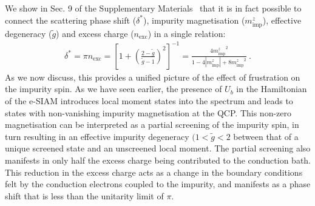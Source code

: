 \documentclass{iopart}
\begin{document}
We show in Sec. 9 of the Supplementary Materials~\cite{supp_mat} that it is in fact  possible to connect the scattering phase shift ($\delta^{*}$), impurity magnetisation ($m_{\text{imp}}^{z}$), effective degeneracy ($\tilde{g}$) and excess charge ($n_{\text{exc}}$) in a single relation:
\begin{eqnarray}\label{phase-mag}
	\delta^* = \pi n_\text{exc} = \left[1 + \left(\frac{2-\tilde g}{\tilde g-1}\right)^2\right]^{-1} = \frac{4{m_{\text{imp}}^z}^2}{1 - 4|m_{\text{imp}}^z| + 8{m_{\text{imp}}^z}^2}~.
\end{eqnarray}
As we now discuss, this provides a unified picture of the effect of frustration on the impurity spin. As we have seen earlier, the presence of \(U_b\) in the Hamiltonian of the e-SIAM introduces local moment states into the spectrum and leads to states with non-vanishing impurity magnetisation at the QCP. This non-zero magnetisation can be interpreted as a partial screening of the impurity spin, in turn resulting in an effective impurity degeneracy \((1 < \tilde g < 2\) between that of a unique screened state and an unscreened local moment. The partial screening also manifests in only half the excess charge being contributed to the conduction bath. This reduction in the excess charge acts as a change in the boundary conditions felt by the conduction electrons coupled to the impurity, and manifests as a phase shift that is less than the unitarity limit of \(\pi\). 
\end{document}
